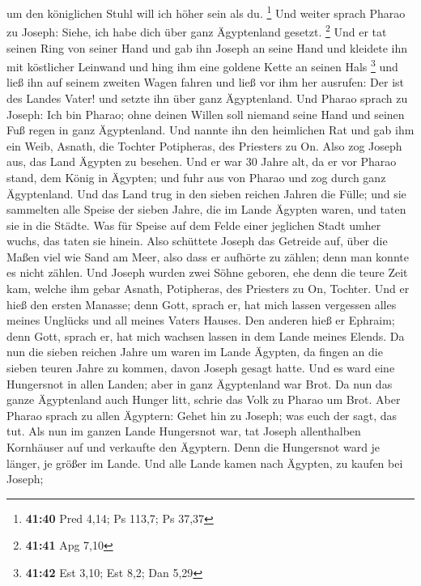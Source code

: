 um den königlichen Stuhl will ich höher sein als du. \footnote{\textbf{41:40}
  Pred 4,14; Ps 113,7; Ps 37,37}  Und weiter sprach
Pharao zu Joseph: Siehe, ich habe dich über ganz Ägyptenland gesetzt.
\footnote{\textbf{41:41} Apg 7,10}  Und er tat seinen
Ring von seiner Hand und gab ihn Joseph an seine Hand und kleidete ihn
mit köstlicher Leinwand und hing ihm eine goldene Kette an seinen Hals
\footnote{\textbf{41:42} Est 3,10; Est 8,2; Dan 5,29} 
und ließ ihn auf seinem zweiten Wagen fahren und ließ vor ihm her
ausrufen: Der ist des Landes Vater! und setzte ihn über ganz
Ägyptenland.  Und Pharao sprach zu Joseph: Ich bin
Pharao; ohne deinen Willen soll niemand seine Hand und seinen Fuß regen
in ganz Ägyptenland.  Und nannte ihn den heimlichen Rat
und gab ihm ein Weib, Asnath, die Tochter Potipheras, des Priesters zu
On. Also zog Joseph aus, das Land Ägypten zu besehen. 
Und er war 30 Jahre alt, da er vor Pharao stand, dem König in Ägypten;
und fuhr aus von Pharao und zog durch ganz Ägyptenland. 
Und das Land trug in den sieben reichen Jahren die Fülle;
 und sie sammelten alle Speise der sieben Jahre, die im
Lande Ägypten waren, und taten sie in die Städte. Was für Speise auf dem
Felde einer jeglichen Stadt umher wuchs, das taten sie hinein.
 Also schüttete Joseph das Getreide auf, über die Maßen
viel wie Sand am Meer, also dass er aufhörte zu zählen; denn man konnte
es nicht zählen.  Und Joseph wurden zwei Söhne geboren,
ehe denn die teure Zeit kam, welche ihm gebar Asnath, Potipheras, des
Priesters zu On, Tochter.  Und er hieß den ersten
Manasse; denn Gott, sprach er, hat mich lassen vergessen alles meines
Unglücks und all meines Vaters Hauses.  Den anderen hieß
er Ephraim; denn Gott, sprach er, hat mich wachsen lassen in dem Lande
meines Elends.  Da nun die sieben reichen Jahre um waren
im Lande Ägypten,  da fingen an die sieben teuren Jahre
zu kommen, davon Joseph gesagt hatte. Und es ward eine Hungersnot in
allen Landen; aber in ganz Ägyptenland war Brot.  Da nun
das ganze Ägyptenland auch Hunger litt, schrie das Volk zu Pharao um
Brot. Aber Pharao sprach zu allen Ägyptern: Gehet hin zu Joseph; was
euch der sagt, das tut.  Als nun im ganzen Lande
Hungersnot war, tat Joseph allenthalben Kornhäuser auf und verkaufte den
Ägyptern. Denn die Hungersnot ward je länger, je größer im Lande.
 Und alle Lande kamen nach Ägypten, zu kaufen bei Joseph;
